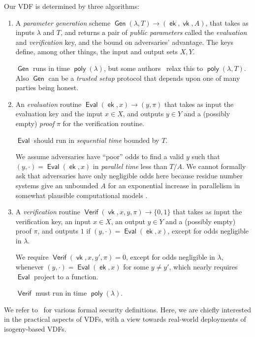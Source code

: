 \documentclass{article}
\DeclareMathOperator{\Gen}{\mathsf{Gen}}
\DeclareMathOperator{\Eval}{\mathsf{Eval}}
\DeclareMathOperator{\Verif}{\mathsf{Verif}}
\DeclareMathOperator{\ek}{\mathsf{ek}}
\DeclareMathOperator{\vk}{\mathsf{vk}}
\DeclareMathOperator{\poly}{\mathsf{poly}}
\begin{document}
Our VDF is determined by three algorithms:
\begin{enumerate}
\item A \emph{parameter generation} scheme $\Gen(λ,T)→(\ek,\vk,A)$,
  that takes as inputs $λ$ and $T$, and returns a pair of
  \emph{public parameters} called the \emph{evaluation} and
  \emph{verification} key, and the bound on adversaries' advantage. 
  The keys define, among other things, the input and output sets
  $X,Y$.

  $\Gen$ runs in time $\poly(λ)$, but some
  authors~\cite{cryptoeprint:2019:166} relax this to
  $\poly(λ,T)$.  
  Also $\Gen$ can be a \emph{trusted setup} protocol that
  depends upon one of many parties being honest.  

\item An \emph{evaluation} routine $\Eval(\ek,x)→(y,π)$ that takes as
  input the evaluation key and the input $x ∈ X$, and outputs $y ∈ Y$
  and a (possibly empty) \emph{proof} $π$ for the verification routine.

  $\Eval$ should run in \emph{sequential time} bounded by $T$. 

  We assume adversaries have ``poor'' odds to find a valid $y$
  such that $(y,\cdot) = \Eval(\ek,x)$ in \emph{parallel time} less
  than $T/A$.
  We cannot formally ask that adversaries have only negligible odds
  here because residue number systems give an unbounded $A$ for an
  exponential increase in parallelism in somewhat plausible 
  computational models \cite{BernsteinSorenson07}.

\item A \emph{verification} routine $\Verif(\vk,x,y,π)→\{0,1\}$ that
  takes as input the verification key, an input $x ∈ X$, an
  output $y ∈ Y$ and a (possibly empty) proof $π$, and outputs $1$
  if $(y,\cdot) = \Eval(\ek,x)$, except for odds negligible in $λ$.

  We require $\Verif(\vk,x,y',π) = 0$, except for odds negligible
  in $λ$, whenever $(y,\cdot) = \Eval(\ek,x)$ for some $y \ne y'$,
  which nearly requires $\Eval$ project to a function. 

  $\Verif$ must run in time $\poly(λ)$.
\end{enumerate}

We refer
to~\cite{Boneh,Wesolowski,Pietrzak,survey,cryptoeprint:2019:166} for
various formal security definitions. %
Here, we are chiefly interested in the practical aspects of VDFs, with
a view towards real-world deployments of isogeny-based VDFs.
\end{document}
